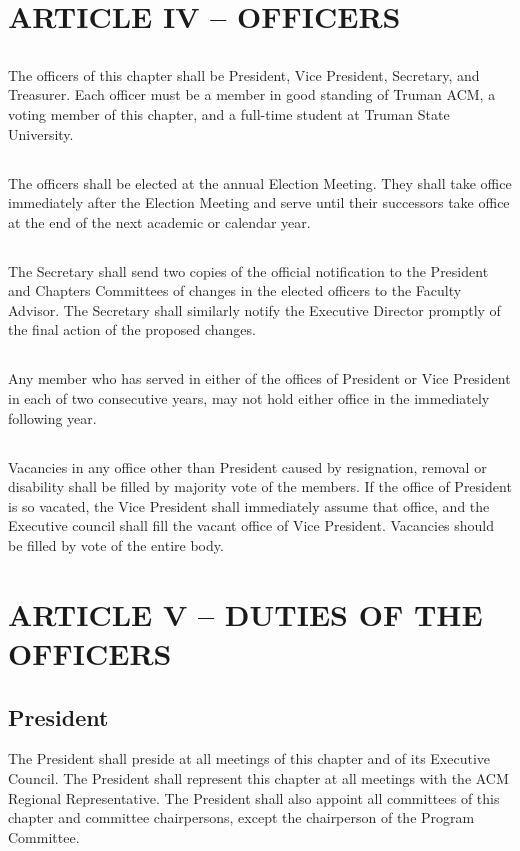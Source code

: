 \documentclass[12pt]{article}
\begin{document}
\section{ARTICLE IV – OFFICERS}
\subsection{}	The officers of this chapter shall be President, Vice President, Secretary, and Treasurer. Each officer must be a member in good standing of Truman ACM, a voting member of this chapter, and a full-time student at Truman State University.
\subsection{}	The officers shall be elected at the annual Election Meeting. They shall take office immediately after the Election Meeting and serve until their successors take office at the end of the next academic or calendar year.
\subsection{}	The Secretary shall send two copies of the official notification to the President and Chapters Committees of changes in the elected officers to the Faculty Advisor. The Secretary shall similarly notify the Executive Director promptly of the final action of the proposed changes.
\subsection{}	Any member who has served in either of the offices of President or Vice President in each of two consecutive years, may not hold either office in the immediately following year.
\subsection{}	Vacancies in any office other than President caused by resignation, removal or disability shall be filled by majority vote of the members. If the office of President is so vacated, the Vice President shall immediately assume that office, and the Executive council shall fill the vacant office of Vice President. Vacancies should be filled by vote of the entire body.

\section{ARTICLE V – DUTIES OF THE OFFICERS}
\subsection{President}	The President shall preside at all meetings of this chapter and of its Executive Council. The President shall represent this chapter at all meetings with the ACM Regional Representative. The President shall also appoint all committees of this chapter and committee chairpersons, except the chairperson of the Program Committee.
\end{document}
